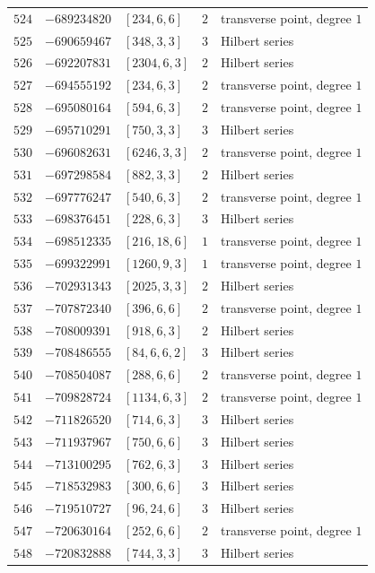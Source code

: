 \documentclass[11pt]{article}
\begin{document}
\begin{center}
\begin{longtable}{r r l c l}
$524$ & $-689234820$ & $[234,6,6]$ & $2$ & transverse point, degree $1$\\
$525$ & $-690659467$ & $[348,3,3]$ & $3$ & Hilbert series\\
$526$ & $-692207831$ & $[2304,6,3]$ & $2$ & Hilbert series\\
$527$ & $-694555192$ & $[234,6,3]$ & $2$ & transverse point, degree $1$\\
$528$ & $-695080164$ & $[594,6,3]$ & $2$ & transverse point, degree $1$\\
$529$ & $-695710291$ & $[750,3,3]$ & $3$ & Hilbert series\\
$530$ & $-696082631$ & $[6246,3,3]$ & $2$ & transverse point, degree $1$\\
$531$ & $-697298584$ & $[882,3,3]$ & $2$ & Hilbert series\\
$532$ & $-697776247$ & $[540,6,3]$ & $2$ & transverse point, degree $1$\\
$533$ & $-698376451$ & $[228,6,3]$ & $3$ & Hilbert series\\
$534$ & $-698512335$ & $[216,18,6]$ & $1$ & transverse point, degree $1$\\
$535$ & $-699322991$ & $[1260,9,3]$ & $1$ & transverse point, degree $1$\\
$536$ & $-702931343$ & $[2025,3,3]$ & $2$ & Hilbert series\\
$537$ & $-707872340$ & $[396,6,6]$ & $2$ & transverse point, degree $1$\\
$538$ & $-708009391$ & $[918,6,3]$ & $2$ & Hilbert series\\
$539$ & $-708486555$ & $[84,6,6,2]$ & $3$ & Hilbert series\\
$540$ & $-708504087$ & $[288,6,6]$ & $2$ & transverse point, degree $1$\\
$541$ & $-709828724$ & $[1134,6,3]$ & $2$ & transverse point, degree $1$\\
$542$ & $-711826520$ & $[714,6,3]$ & $3$ & Hilbert series\\
$543$ & $-711937967$ & $[750,6,6]$ & $3$ & Hilbert series\\
$544$ & $-713100295$ & $[762,6,3]$ & $3$ & Hilbert series\\
$545$ & $-718532983$ & $[300,6,6]$ & $3$ & Hilbert series\\
$546$ & $-719510727$ & $[96,24,6]$ & $3$ & Hilbert series\\
$547$ & $-720630164$ & $[252,6,6]$ & $2$ & transverse point, degree $1$\\
$548$ & $-720832888$ & $[744,3,3]$ & $3$ & Hilbert series\\

\end{longtable}
\end{center}
\end{document}
